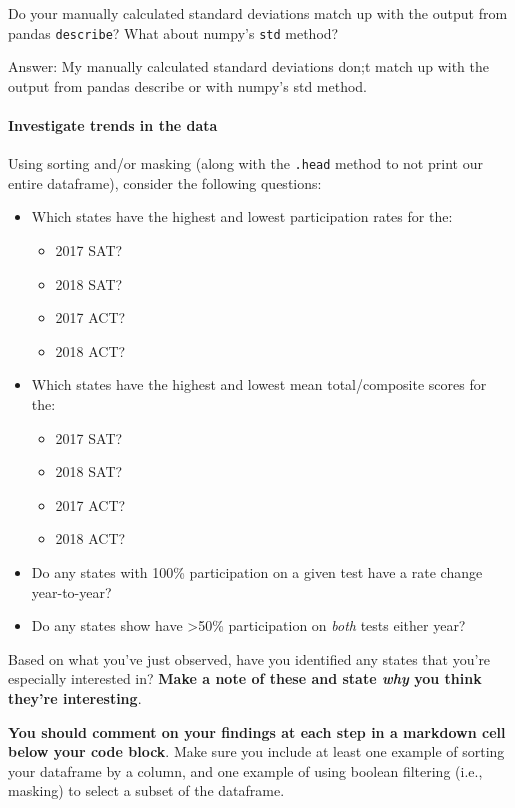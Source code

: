 \documentclass[11pt]{article}
\providecommand{\tightlist}{%
      \setlength{\itemsep}{0pt}\setlength{\parskip}{0pt}}
\begin{document}
    Do your manually calculated standard deviations match up with the output
from pandas \texttt{describe}? What about numpy's \texttt{std} method?

    Answer: My manually calculated standard deviations don;t match up with
the output from pandas describe or with numpy's std method.

    \paragraph{Investigate trends in the
data}\label{investigate-trends-in-the-data}

Using sorting and/or masking (along with the \texttt{.head} method to
not print our entire dataframe), consider the following questions:

\begin{itemize}
\tightlist
\item
  Which states have the highest and lowest participation rates for the:

  \begin{itemize}
  \tightlist
  \item
    2017 SAT?
  \item
    2018 SAT?
  \item
    2017 ACT?
  \item
    2018 ACT?
  \end{itemize}
\item
  Which states have the highest and lowest mean total/composite scores
  for the:

  \begin{itemize}
  \tightlist
  \item
    2017 SAT?
  \item
    2018 SAT?
  \item
    2017 ACT?
  \item
    2018 ACT?
  \end{itemize}
\item
  Do any states with 100\% participation on a given test have a rate
  change year-to-year?
\item
  Do any states show have \textgreater{}50\% participation on
  \emph{both} tests either year?
\end{itemize}

Based on what you've just observed, have you identified any states that
you're especially interested in? \textbf{Make a note of these and state
\emph{why} you think they're interesting}.

\textbf{You should comment on your findings at each step in a markdown
cell below your code block}. Make sure you include at least one example
of sorting your dataframe by a column, and one example of using boolean
filtering (i.e., masking) to select a subset of the dataframe.
\end{document}
